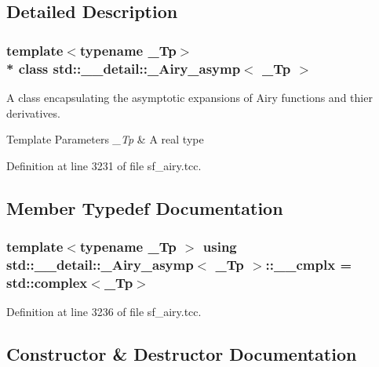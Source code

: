 \subsection{Detailed Description}
\subsubsection*{template$<$typename \+\_\+\+Tp$>$\\*
class std\+::\+\_\+\+\_\+detail\+::\+\_\+\+Airy\+\_\+asymp$<$ \+\_\+\+Tp $>$}

A class encapsulating the asymptotic expansions of Airy functions and thier derivatives.


\begin{DoxyTemplParams}{Template Parameters}
{\em \+\_\+\+Tp} & A real type \\
\hline
\end{DoxyTemplParams}


Definition at line 3231 of file sf\+\_\+airy.\+tcc.



\subsection{Member Typedef Documentation}
\subsubsection[{\texorpdfstring{\+\_\+\+\_\+cmplx}{__cmplx}}]{\setlength{\rightskip}{0pt plus 5cm}template$<$typename \+\_\+\+Tp $>$ using {\bf std\+::\+\_\+\+\_\+detail\+::\+\_\+\+Airy\+\_\+asymp}$<$ \+\_\+\+Tp $>$\+::{\bf \+\_\+\+\_\+cmplx} =  std\+::complex$<$\+\_\+\+Tp$>$}\hypertarget{classstd_1_1____detail_1_1__Airy__asymp_a5b480a849dafb98256e445a475813db1}{}\label{classstd_1_1____detail_1_1__Airy__asymp_a5b480a849dafb98256e445a475813db1}


Definition at line 3236 of file sf\+\_\+airy.\+tcc.



\subsection{Constructor \& Destructor Documentation}
